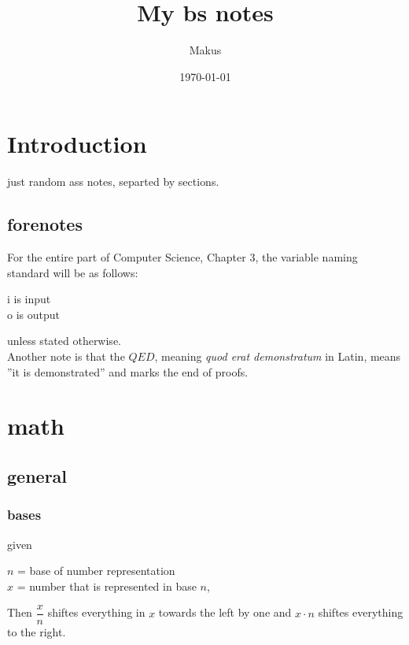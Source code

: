 \documentclass{article} %
\title{My bs notes}
\author{Makus}
\date{\today}
\theoremstyle{theorem}
\theoremstyle{definition}
\begin{document}
\maketitle

\setcounter{tocdepth}{5}
\tableofcontents
\pagebreak
\section{Introduction}
    \begin{center}
        just random ass notes, separted by sections.
    \end{center}
    \subsection{forenotes}
    For the entire part of Computer Science, Chapter 3, the variable naming standard will be as follows:
    \begin{center}
        i is input\\ o is output
    \end{center}
    unless stated otherwise.
    \\Another note is that the $QED$, meaning \textit{quod erat demonstratum} in Latin, means ''it is demonstrated'' and marks the end of proofs.
\pagebreak
\section{math}%
    \subsection{general}
        \subsubsection{bases}
        given  \begin{center}
            $n$ = base of number representation\\
            $x$ = number that is represented in base $n$,
        \end{center}
        Then $\dfrac{x}{n}$ shiftes everything in $x$ towards the left by one and $x\cdot n$ shiftes everything to the right.
\end{document}

